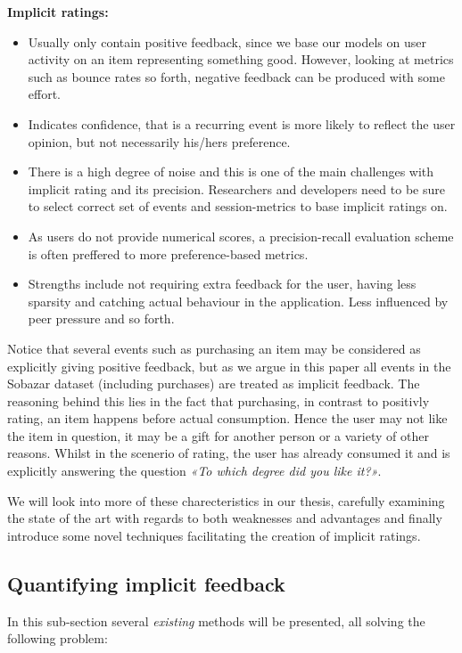 \textbf{Implicit ratings:}
\begin{itemize}
\item Usually only contain positive feedback, since we base our models on user
activity on an item representing something good. However, looking at metrics
such as bounce rates so forth, negative feedback can be produced with some
effort.
\item Indicates confidence, that is a recurring event is more likely to reflect
the user opinion, but not necessarily his/hers preference.
\item There is a high degree of noise and this is one of the main challenges
with implicit rating and its precision. Researchers and developers need to be
sure to select correct set of events and session-metrics to base implicit
ratings on.
\item As users do not provide numerical scores, a precision-recall evaluation
scheme is often preffered to more preference-based metrics.
\item Strengths include not requiring extra feedback for the user, having less
sparsity and catching actual behaviour in the application. Less influenced by
peer pressure and so forth.
\end{itemize}

Notice that several events such as purchasing an item may be considered as
explicitly giving positive feedback, but as we argue in this paper all events
in the Sobazar dataset (including purchases) are treated as implicit feedback.
The reasoning behind this lies in the fact that purchasing, in contrast to
positivly rating, an item happens before actual consumption. Hence the user may
not like the item in question, it may be a gift for another person or a variety
of other reasons. Whilst in the scenerio of rating, the user has already
consumed it and is explicitly answering the question \textit{«To which degree
did you like it?»}.

We will look into more of these charecteristics in our thesis, carefully
examining the state of the art with regards to both weaknesses and advantages
and finally introduce some novel techniques facilitating the creation of
implicit ratings.

\clearpage

\subsection{Quantifying implicit feedback}

In this sub-section several \textit{existing} methods will be presented, all
solving the following problem:

